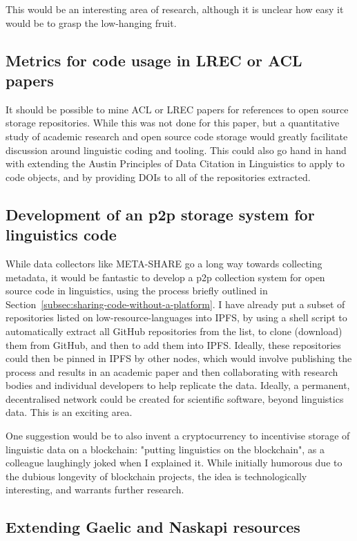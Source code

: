 This would be an interesting area of research, although it is unclear how easy it would be to grasp the low-hanging fruit.

\subsection{Metrics for code usage in LREC or ACL papers}

It should be possible to mine ACL or LREC papers for references to open source storage repositories. While this was not done for this paper, but a quantitative study of academic research and open source code storage would greatly facilitate discussion around linguistic coding and tooling. This could also go hand in hand with extending the Austin Principles of Data Citation in Linguistics \citet{AustinPrinciples2017} to apply to code objects, and by providing DOIs to all of the repositories extracted.

\subsection{Development of an p2p storage system for linguistics code}

While data collectors like META-SHARE go a long way towards collecting metadata, it would be fantastic to develop a p2p collection system for open source code in linguistics, using the process briefly outlined in Section~\ref{subsec:sharing-code-without-a-platform}. I have already put a subset of repositories listed on low-resource-languages into IPFS, by using a shell script to automatically extract all GitHub repositories from the list, to clone (download) them from GitHub, and then to add them into IPFS. Ideally, these repositories could then be pinned in IPFS by other nodes, which would involve publishing the process and results in an academic paper and then collaborating with research bodies and individual developers to help replicate the data. Ideally, a permanent, decentralised network could be created for scientific software, beyond linguistics data. This is an exciting area.

One suggestion would be to also invent a cryptocurrency to incentivise storage of linguistic data on a blockchain: "putting linguistics on the blockchain", as a colleague laughingly joked when I explained it. While initially humorous due to the dubious longevity of blockchain projects, the idea is technologically interesting, and warrants further research.

\subsection{Extending Gaelic and Naskapi resources}


